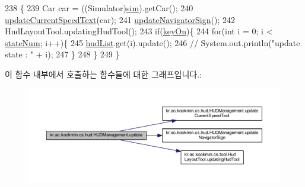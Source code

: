 \begin{DoxyCode}
238   \{
239     Car car = ((Simulator)\hyperlink{classkr_1_1ac_1_1kookmin_1_1cs_1_1hud_1_1_h_u_d_management_abcbcea66aba5169a6d07c407d1e3c86d}{sim}).getCar();
240     \hyperlink{classkr_1_1ac_1_1kookmin_1_1cs_1_1hud_1_1_h_u_d_management_aeb454637f977e672b79282823b6b1cde}{updateCurrentSpeedText}(car);
241     \hyperlink{classkr_1_1ac_1_1kookmin_1_1cs_1_1hud_1_1_h_u_d_management_ae4cd0a7adf3e6e05e2c515bc4ec630ac}{updateNavigatorSign}();
242     HudLayoutTool.updatingHudTool();
243     \textcolor{keywordflow}{if}(\hyperlink{classkr_1_1ac_1_1kookmin_1_1cs_1_1hud_1_1_h_u_d_management_ac411b7fde47d1bec2bd043b2f2df51e8}{keyOn})\{
244       \textcolor{keywordflow}{for}(\textcolor{keywordtype}{int} i = 0; i < \hyperlink{classkr_1_1ac_1_1kookmin_1_1cs_1_1hud_1_1_h_u_d_management_ac951218e3771940c9b4555f3ac830d7f}{stateNum}; i++)\{
245         \hyperlink{classkr_1_1ac_1_1kookmin_1_1cs_1_1hud_1_1_h_u_d_management_a9eec206ae0d3464de9e92243ae0aba24}{hudList}.get(i).update();
246         \textcolor{comment}{//              System.out.println("update state : " + i);}
247       \}
248     \}
249   \}
\end{DoxyCode}


이 함수 내부에서 호출하는 함수들에 대한 그래프입니다.\+:\nopagebreak
\begin{figure}[H]
\begin{center}
\leavevmode
\includegraphics[width=350pt]{classkr_1_1ac_1_1kookmin_1_1cs_1_1hud_1_1_h_u_d_management_a0aa136c1c12cdff5b49304a0b750d3bb_cgraph}
\end{center}
\end{figure}


\hypertarget{classkr_1_1ac_1_1kookmin_1_1cs_1_1hud_1_1_h_u_d_management_aeb454637f977e672b79282823b6b1cde}{}
